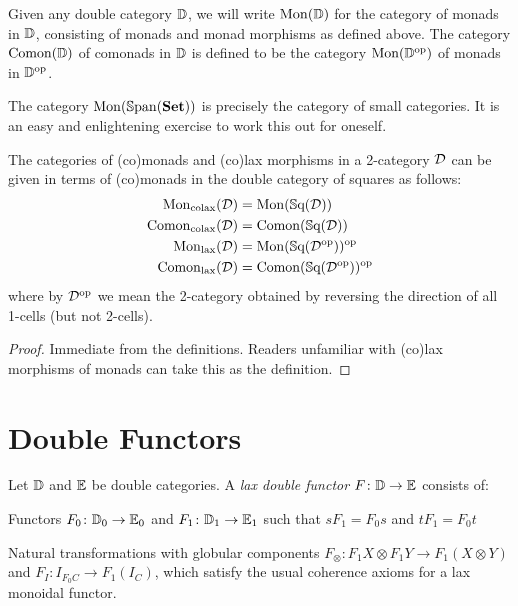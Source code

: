 \begin{definition}
	Given any double category $\mathbb{D}$, we will write $\mathrm{Mon}(\mathbb{D})$ for the category of monads in $\mathbb{D}$, consisting of monads and monad morphisms as defined above. The category $\mathrm{Comon}(\mathbb{D})$ of comonads in $\mathbb{D}$ is defined to be the category $\mathrm{Mon}(\mathbb{D}^{\text{op}})$ of monads in $\mathbb{D}^{\text{op}}$.
\end{definition}

\begin{example}
	The category $\mathrm{Mon}(\mathbb{S}\mathrm{pan}(\mathbf{Set}))$ is precisely the category of small categories. It is an easy and enlightening exercise to work this out for oneself.
\end{example}

\begin{proposition}
	The categories of (co)monads and (co)lax morphisms in a 2-category $\mathcal{D}$ can be given in terms of (co)monads in the double category of squares as follows:
	\begin{align*}
		\mathrm{Mon}_{\text{colax}}(\mathcal{D}) &= \mathrm{Mon}(\mathbb{S}\mathrm{q}(\mathcal{D})) \\
		\mathrm{Comon}_{\text{colax}}(\mathcal{D}) &= \mathrm{Comon}(\mathbb{S}\mathrm{q}(\mathcal{D})) \\
		\mathrm{Mon}_{\text{lax}}(\mathcal{D}) &= \mathrm{Mon}(\mathbb{S}\mathrm{q}(\mathcal{D}^{\text{op}}))^{\text{op}} \\
		\mathrm{Comon}_{\text{lax}}(\mathcal{D}) &= \mathrm{Comon}(\mathbb{S}\mathrm{q}(\mathcal{D}^{\text{op}}))^{\text{op}}
	\end{align*}
	where by $\mathcal{D}^{\text{op}}$ we mean the 2-category obtained by reversing the direction of all 1-cells (but not 2-cells).
\end{proposition}
\begin{proof}
	Immediate from the definitions. Readers unfamiliar with (co)lax morphisms of monads can take this as the definition.
\end{proof}

\section{Double Functors}

\begin{definition}\label{Def:LaxDblFunc}
	Let $\mathbb{D}$ and $\mathbb{E}$ be double categories. A \emph{lax double functor} $F\colon\mathbb{D}\to\mathbb{E}$ consists of:
	\begin{compactitem}
		\item Functors $F_0\colon\mathbb{D}_0 \to\mathbb{E}_0$ and $F_1\colon\mathbb{D}_1 \to\mathbb{E}_1$ such that $sF_1=F_0s$ and $tF_1=F_0t$
		\item Natural transformations with globular components $F_{\otimes}\colon F_1X\otimes F_1Y\to F_1(X\otimes Y)$ and $F_I\colon I_{F_0C}\to F_1(I_C)$, which satisfy the usual coherence axioms for a lax monoidal functor.
	\end{compactitem}
\end{definition}

